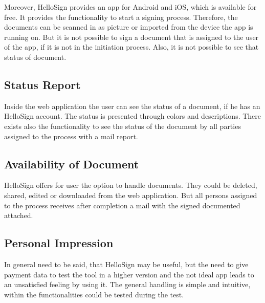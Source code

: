 Moreover, HelloSign provides an \gls{app} for Android and iOS, which is available for free. It provides the functionality to start a signing process. Therefore, the documents can be scanned in as picture or imported from the device the \gls{app} is running on. But it is not possible to sign a document that is assigned to the user of the \gls{app}, if it is not in the initiation process. Also, it is not possible to see that status of document.

\subsection{Status Report}
Inside the web application the user can see the status of a document, if he has an HelloSign account. The status is presented through colors and descriptions. There exists also the functionality to see the status of the document by all parties assigned to the process with a mail report. 

\subsection{Availability of Document}
HelloSign offers for user the option to handle documents. They could be deleted, shared, edited or downloaded from the web application. But all persons assigned to the process receives after completion a mail with the signed documented attached.

\subsection{Personal Impression}
In general need to be said, that HelloSign may be useful, but the need to give payment data to test the tool in a higher version and the not ideal \gls{app} leads to an unsatisfied feeling by using it. The general handling is simple and intuitive, within the functionalities could be tested during the test.